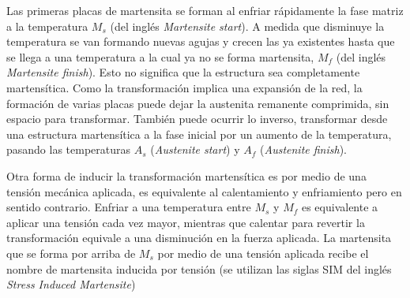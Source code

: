 \documentclass[a4paper,12pt,fleqn,twoside,openany]{book}
\begin{document}

Las primeras placas de martensita se forman al enfriar rápidamente la fase matriz a la temperatura $M_{s}$ (del inglés \textit{Martensite start}). 
A medida que disminuye la temperatura se van formando nuevas agujas y crecen las ya existentes hasta que se llega a una temperatura 
a la cual ya no se forma martensita, $M_{f}$ (del inglés \textit{Martensite finish}). Esto no significa que la estructura sea completamente martensítica. 
Como la transformación implica una expansión de la red, la formación de varias placas puede dejar la austenita remanente comprimida, 
sin espacio para transformar. También puede ocurrir lo inverso, transformar desde una estructura martensítica a la fase inicial 
por un aumento de la temperatura, pasando las temperaturas $A_{s}$ (\textit{Austenite start}) y $A_{f}$ (\textit{Austenite finish}).

  

Otra forma de inducir la transformación martensítica es por medio de una tensión mecánica aplicada, es equivalente al calentamiento y enfriamiento pero en 
sentido contrario. Enfriar a una temperatura entre $M_{s}$ y $M_{f}$ es equivalente a aplicar una tensión cada vez mayor, mientras que calentar para revertir la 
transformación equivale a una disminución en la fuerza aplicada. La martensita que se forma por arriba de $M_{s}$ por medio de una 
tensión aplicada recibe el nombre de martensita inducida por tensión (se utilizan las siglas SIM del inglés \textit{Stress Induced Martensite})

  
\end{document}
